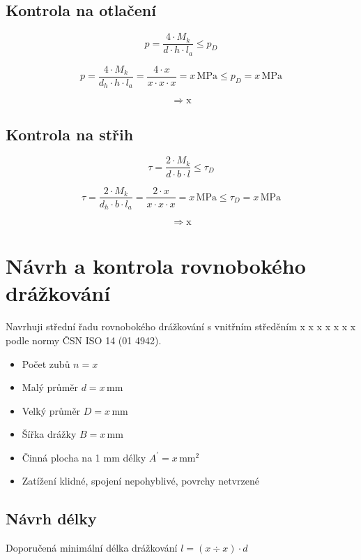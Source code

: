 \documentclass[a4paper,11pt]{article}
\newcommand{\Mk}{x} %
\newcommand{\dhr}{x} %
\newcommand{\bPera}{x} %
\newcommand{\hPera}{x} %
\newcommand{\laPera}{x} %
\newcommand{\pD}{x} %
\newcommand{\pSkut}{x} %
\newcommand{\otlacVysledek}{x} %
\newcommand{\tauD}{x} %
\newcommand{\tauSkut}{x} %
\newcommand{\strihVysledek}{x} %
\newcommand{\nDraz}{x} %
\newcommand{\dDraz}{x} %
\newcommand{\DDraz}{x} %
\newcommand{\bDraz}{x} %
\newcommand{\Adr}{x} %
\newcommand{\lKoefMinDraz}{x} %
\newcommand{\lKoefMaxDraz}{x} %
\begin{document}
\subsection{Kontrola na otlačení}

\[ p = \frac{4 \cdot M_k}{d \cdot h \cdot l_a} \leq p_D \]

\[ p = \frac{4 \cdot M_k}{d_h \cdot h \cdot l_a} = \frac{4 \cdot \Mk{}}{\dhr{} \cdot \hPera{} \cdot \laPera{}} = \pSkut{} \mathrm{\,MPa} \leq p_D = \pD{} \mathrm{\,MPa} \]

\[ \Rightarrow \mathrm{\otlacVysledek{}} \]

\subsection{Kontrola na střih}

\[ \tau = \frac{2 \cdot M_k}{d \cdot b \cdot l} \leq \tau_D \]

\[ \tau = \frac{2 \cdot M_k}{d_h \cdot b \cdot l_a} = \frac{2 \cdot \Mk{}}{\dhr{} \cdot \bPera{} \cdot \laPera{}} = \tauSkut{} \mathrm{\,MPa} \leq \tau_D  = \tauD{} \mathrm{\,MPa} \]

\[ \Rightarrow \mathrm{\strihVysledek{}} \]

\section{Návrh a kontrola rovnobokého drážkování}

Navrhuji střední řadu rovnobokého drážkování s vnitřním středěním \nDraz{} x \dDraz{} x \DDraz{} x \bDraz{} podle normy ČSN ISO 14 (01 4942).
\begin{itemize}
\item Počet zubů $n = \nDraz{}$
\item Malý průměr $d = \dDraz{} \mathrm{\,mm}$
\item Velký průměr $D = \DDraz{} \mathrm{\,mm}$
\item Šířka drážky $B = \bDraz{} \mathrm{\,mm}$
\item Činná plocha na 1 mm délky $A^{'} = \Adr{} \mathrm{\,mm}^2$
\item Zatížení klidné, spojení nepohyblivé, povrchy netvrzené
\end{itemize}

\subsection{Návrh délky}

Doporučená minimální délka drážkování $l = (\lKoefMinDraz{} \div \lKoefMaxDraz{}) \cdot d$
\end{document}
